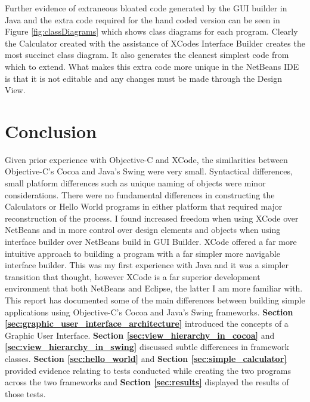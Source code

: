 \documentclass[a4paper,14pt]{article}
\begin{document}
Further evidence of extraneous bloated code generated by the GUI builder in Java and the extra code required for the hand coded version can be seen in Figure \ref{fig:classDiagrams} which shows class diagrams for each program. Clearly the Calculator created with the assistance of XCodes Interface Builder creates the most succinct class diagram. It also generates the cleanest simplest code from which to extend. What makes this extra code more unique in the NetBeans IDE is that it is not editable and any changes must be made through the Design View.



\section{Conclusion} %
\label{sec:conclusion}
Given prior experience with Objective-C and XCode, the similarities between Objective-C's Cocoa and Java's Swing were very small. Syntactical differences, small platform differences such as unique naming of objects were minor considerations. There were no fundamental differences in constructing the Calculators or Hello World programs in either platform that required major reconstruction of the process. I found increased freedom when using XCode over NetBeans and in more control over design elements and objects when using interface builder over NetBeans build in GUI Builder. XCode offered a far more intuitive approach to building a program with a far simpler more navigable interface builder. This was my first experience with Java and it was a simpler transition that thought, however XCode is a far superior development environment that both NetBeans and Eclipse, the latter I am more familiar with. This report has documented some of the main differences between building simple applications using Objective-C's Cocoa and Java's Swing frameworks. \textbf{Section \ref{sec:graphic_user_interface_architecture}} introduced the concepts of a Graphic User Interface. \textbf{Section \ref{sec:view_hierarchy_in_cocoa}} and \textbf{\ref{sec:view_hierarchy_in_swing}} discussed subtle differences in framework classes. \textbf{Section \ref{sec:hello_world}} and \textbf{Section \ref{sec:simple_calculator}} provided evidence relating to tests conducted while creating the two programs across the two frameworks and \textbf{Section \ref{sec:results}} displayed the results of those tests.


\newpage
\scriptsize{}

\end{document}
